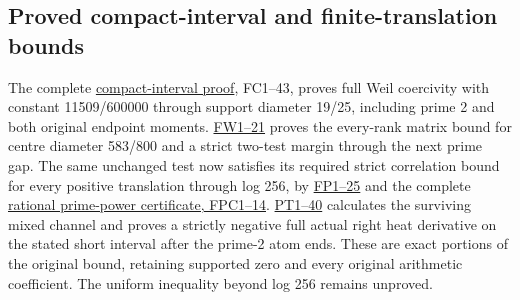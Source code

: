 \documentclass[
  10pt,
  a4paper,
]{article}
\begin{document}
\subsection{Proved compact-interval and finite-translation
bounds}\label{proved-compact-interval-and-finite-translation-bounds}

The complete \href{FIRST_PRIME_FULL_WEIL_COERCIVITY.md}{compact-interval
proof}, FC1--43, proves full Weil coercivity with constant 11509/600000
through support diameter 19/25, including prime 2 and both original
endpoint moments. \href{FIRST_PRIME_WINDOW_BOUND.md}{FW1--21} proves the
every-rank matrix bound for centre diameter 583/800 and a strict
two-test margin through the next prime gap. The same unchanged test now
satisfies its required strict correlation bound for every positive
translation through log 256, by
\href{FINITE_PRIME_WINDOW_EXTENSION.md}{FP1--25} and the complete
\href{FINITE_PRIME_WINDOW_COEFFICIENT_CERTIFICATE.md}{rational
prime-power certificate, FPC1--14}.
\href{PRIME_TWO_HEAT_TAIL_DERIVATION.md}{PT1--40} calculates the
surviving mixed channel and proves a strictly negative full actual right
heat derivative on the stated short interval after the prime-2 atom
ends. These are exact portions of the original bound, retaining
supported zero and every original arithmetic coefficient. The uniform
inequality beyond log 256 remains unproved.
\end{document}
